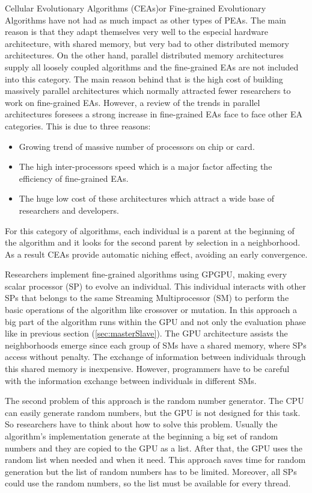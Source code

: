 \documentclass{comjnl}
\begin{document}
Cellular Evolutionary Algorithms (CEAs)or Fine-grained Evolutionary Algorithms have not had as much impact as other types of PEAs. The main reason is that they adapt themselves very well to the especial hardware architecture, with shared memory, but very bad to other distributed memory architectures. On the other hand, parallel distributed memory architectures supply all loosely coupled algorithms and the fine-grained EAs are not included into this category. The main reason behind that is the high cost of building massively parallel architectures which normally attracted fewer researchers to work on fine-grained EAs. However, a review of the trends in parallel architectures foresees a strong increase in fine-grained EAs face to face other EA categories. This is due to three reasons: 

\begin{itemize}
\item Growing trend of massive number of processors on chip or card. 
\item The high inter-processors speed which is a major factor affecting the efficiency of fine-grained EAs. 
\item The huge low cost of these architectures which attract a wide base of researchers and developers. 
\end{itemize}

For this category of algorithms, each individual is a parent at the beginning of the algorithm and it looks for the second parent by selection in a neighborhood. As a result CEAs provide automatic niching effect, avoiding an early convergence. 

Researchers implement fine-grained algorithms using GPGPU, making every scalar processor (SP) to evolve an individual. This individual interacts with other SPs that belongs to the same Streaming Multiprocessor (SM) to perform the basic operations of the algorithm like crossover or mutation. In this approach a big part of the algorithm runs within the GPU and not only the evaluation phase like in previous section (\ref{sec:masterSlave}). The GPU architecture assists the neighborhoods emerge since each group of SMs have a shared memory, where SPs access without penalty. The exchange of information between individuals through this shared memory is inexpensive. However, programmers have to be careful with the information exchange between individuals in different SMs. 

The second problem of this approach is the random number generator. The CPU can easily generate random numbers, but the GPU is not designed for this task. So researchers have to think about how to solve this problem. Usually the algorithm's implementation generate at the beginning a big set of random numbers and they are copied to the GPU as a list. After that, the GPU uses the random list when needed and when it need. This approach saves time for random generation but the list of random numbers has to be limited. Moreover, all SPs could use the random numbers, so the list must be available for every thread. 
\end{document}
